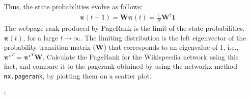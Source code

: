 \documentclass[11pt]{exam}
\begin{document}
\begin{questions}
\begin{parts}
Thus, the state probabilities evolve as follows:
\begin{align*}
  \bm{\pi}(t+1) = \bm{W}\bm{\pi}(t) = \frac{1}{N}\bm{W}^t\bm{1} 
\end{align*}
The webpage rank produced by PageRank is the limit of the state probabilities, $\bm{\pi}(t)$, for a large $t\rightarrow \infty$. The limiting distribution is the left eigenvector of the probability transition matrix ($\bm{W}$) that corresponds to an eigenvalue of 1, i.e., ${\bm{\pi}^\star}^T = {\bm{\pi}^\star}^T \bm{W}$.
Calculate the PageRank for the Wikispeedia network using this fact, and compare it to the pagerank obtained by using the networkx method \texttt{nx.pagerank}, by plotting them on a scatter plot.
\end{parts}

:

\end{questions}
\end{document}
